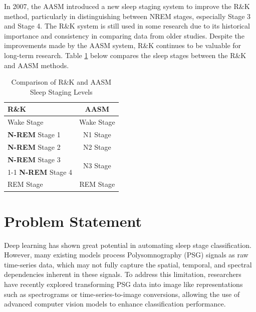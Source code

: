 In 2007, the AASM introduced a new sleep staging system to improve the R\&K method, particularly in distinguishing between \acs{NREM} stages, especially Stage 3 and Stage 4. The R\&K system is still used in some research due to its historical importance and consistency in comparing data from older studies. Despite the improvements made by the \acs{AASM} system, R\&K continues to be valuable for long-term research. Table \ref{tab:sleep_staging} below compares the sleep stages between the R\&K and \acs{AASM} methods.

\begin{table}[H]
    \centering
    \begin{tabular}{|l|c|}
        \hline
        \textbf{R\&K} & \textbf{AASM} \\
        \hline
         Wake Stage &  Wake Stage \\
        \hline
        \textbf{N-REM} Stage 1 & N1 Stage \\
        \hline
        \textbf{N-REM} Stage 2 & N2 Stage \\
        \hline
        \textbf{N-REM} Stage 3 & \multirow{2}{*}{N3 Stage} \\
        \cline{1-1}
        \textbf{N-REM} Stage 4 &  \\
        \hline
         REM Stage &  REM Stage \\
        \hline
    \end{tabular}
    \caption{Comparison of R\&K and AASM Sleep Staging Levels}
    \label{tab:sleep_staging}
\end{table}

\section{Problem Statement}

Deep learning has shown great potential in automating sleep stage classification. However, many existing models process Polysomnography (PSG) signals as raw time-series data, which may not fully capture the spatial, temporal, and spectral dependencies inherent in these signals. To address this limitation, researchers have recently explored transforming \ac{PSG} data into image like representations such as spectrograms or time-series-to-image conversions, allowing the use of advanced computer vision models to enhance classification performance.\\

